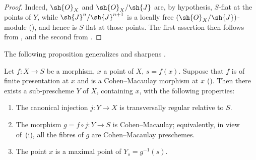 \begin{proof}
Indeed, $\sh{O}_X$ and $\sh{O}_X/\sh{J}$ are, by hypothesis, $S$-flat at the points of $Y$, while $\sh{J}^n/\sh{J}^{n+1}$ is a locally free $(\sh{O}_X/\sh{J})$-module (), and hence is $S$-flat at those points.
The first assertion then follows from , and the second from .
\end{proof}

The following proposition generalizes and sharpens .

\begin{proposition}[19.2.9]
\label{IV.19.2.9}
Let $f:X\to S$ be a morphism, $x$ a point of $X$, $s=f(x)$.
Suppose that $f$ is of finite presentation at $x$ and is a Cohen--Macaulay morphism at $x$ ().
Then there exists a sub-prescheme $Y$ of $X$, containing $x$, with the following properties:
\begin{enumerate}[label=(\roman*)]
  \item The canonical injection $j:Y\to X$ is transversally regular relative to $S$.
  \item The morphism $g=f\circ j:Y\to S$ is Cohen--Macaulay; equivalently, in view of~(i), all the fibres of $g$ are Cohen--Macaulay preschemes.
  \item The point $x$ is a maximal point of $Y_s=g^{-1}(s)$.
\end{enumerate}
\end{proposition}


